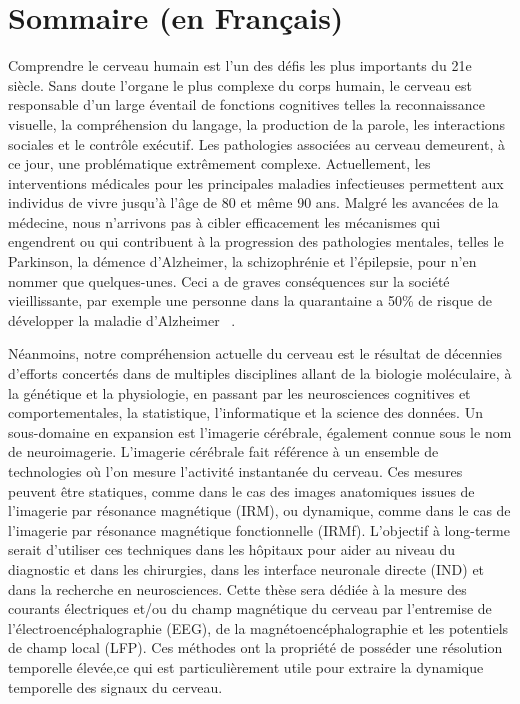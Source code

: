 \chapter{Sommaire (en Français)}
\label{chapter:sommaire}
\pagestyle{mainmatter}

Comprendre le cerveau humain  est l'un des défis les plus importants du 21e siècle. Sans doute l'organe le plus complexe du corps humain, le cerveau est responsable  d’un large éventail de fonctions cognitives telles la reconnaissance visuelle, la compréhension du langage, la production de la parole, les interactions sociales et le contrôle exécutif. Les pathologies associées au cerveau demeurent, à ce jour, une problématique extrêmement complexe.  Actuellement, les interventions médicales pour les principales maladies infectieuses permettent aux individus de vivre jusqu'à l’âge de 80 et même  90 ans. Malgré les avancées de la médecine, nous n’arrivons pas à cibler efficacement les mécanismes  qui engendrent ou qui contribuent à la progression des pathologies mentales, telles le Parkinson, la démence d’Alzheimer, la schizophrénie  et l’épilepsie, pour n'en nommer que quelques-unes. Ceci a de graves conséquences sur la société vieillissante, par exemple une personne  dans la quarantaine a 50\% de risque de développer la maladie d'Alzheimer ~\citep{alzheimer20162016}.

Néanmoins, notre compréhension actuelle du cerveau est le résultat de décennies d'efforts concertés dans de multiples disciplines allant de la biologie moléculaire, à la génétique et la physiologie, en passant par les neurosciences cognitives et comportementales, la statistique, l'informatique et la science des données. Un sous-domaine en expansion est l'imagerie cérébrale, également connue sous le nom de neuroimagerie. L'imagerie cérébrale fait référence à un ensemble de technologies où l'on mesure l’activité  instantanée du cerveau. Ces mesures peuvent être statiques, comme dans le cas des images anatomiques issues de l'imagerie par résonance magnétique (IRM), ou dynamique, comme dans le cas de l'imagerie par résonance magnétique fonctionnelle (IRMf). L’objectif à long-terme serait d’utiliser ces techniques  dans les hôpitaux pour aider au niveau du diagnostic et dans les chirurgies, dans les interface neuronale directe (IND) et dans la recherche en neurosciences. Cette thèse sera dédiée à  la mesure des courants électriques et/ou du champ magnétique du cerveau par l’entremise de l'électroencéphalographie (EEG), de la magnétoencéphalographie et les potentiels de champ local (LFP). Ces méthodes ont la propriété de posséder une résolution temporelle élevée,ce qui est particulièrement utile pour extraire la dynamique temporelle des signaux du cerveau.

